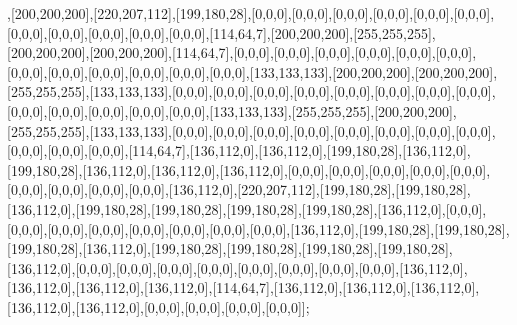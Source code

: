 ,[200,200,200],[220,207,112],[199,180,28],[0,0,0],[0,0,0],[0,0,0],[0,0,0],[0,0,0],[0,0,0],[0,0,0],[0,0,0],[0,0,0],[0,0,0],[0,0,0],[114,64,7],[200,200,200],[255,255,255],[200,200,200],[200,200,200],[114,64,7],[0,0,0],[0,0,0],[0,0,0],[0,0,0],[0,0,0],[0,0,0],[0,0,0],[0,0,0],[0,0,0],[0,0,0],[0,0,0],[0,0,0],[133,133,133],[200,200,200],[200,200,200],[255,255,255],[133,133,133],[0,0,0],[0,0,0],[0,0,0],[0,0,0],[0,0,0],[0,0,0],[0,0,0],[0,0,0],[0,0,0],[0,0,0],[0,0,0],[0,0,0],[0,0,0],[133,133,133],[255,255,255],[200,200,200],[255,255,255],[133,133,133],[0,0,0],[0,0,0],[0,0,0],[0,0,0],[0,0,0],[0,0,0],[0,0,0],[0,0,0],[0,0,0],[0,0,0],[0,0,0],[114,64,7],[136,112,0],[136,112,0],[199,180,28],[136,112,0],[199,180,28],[136,112,0],[136,112,0],[136,112,0],[0,0,0],[0,0,0],[0,0,0],[0,0,0],[0,0,0],[0,0,0],[0,0,0],[0,0,0],[0,0,0],[136,112,0],[220,207,112],[199,180,28],[199,180,28],[136,112,0],[199,180,28],[199,180,28],[199,180,28],[199,180,28],[136,112,0],[0,0,0],[0,0,0],[0,0,0],[0,0,0],[0,0,0],[0,0,0],[0,0,0],[0,0,0],[136,112,0],[199,180,28],[199,180,28],[199,180,28],[136,112,0],[199,180,28],[199,180,28],[199,180,28],[199,180,28],[136,112,0],[0,0,0],[0,0,0],[0,0,0],[0,0,0],[0,0,0],[0,0,0],[0,0,0],[0,0,0],[136,112,0],[136,112,0],[136,112,0],[136,112,0],[114,64,7],[136,112,0],[136,112,0],[136,112,0],[136,112,0],[136,112,0],[0,0,0],[0,0,0],[0,0,0],[0,0,0]];

